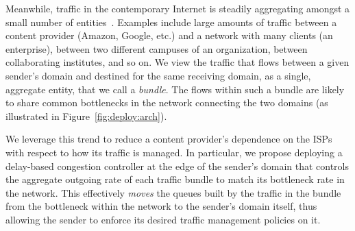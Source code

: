 \fi




Meanwhile, traffic in the contemporary Internet is steadily aggregating amongst a small number of entities~\cite{fivecomps}. 
Examples include large amounts of traffic between a content provider (\eg Amazon, Google, etc.) and a network with many clients (\eg an enterprise), between two different campuses of an organization, between collaborating institutes, and so on.
We view the traffic that flows between a given sender's domain and destined for the same receiving domain, as a single, aggregate entity, that we call a \emph{bundle}.
The flows within such a bundle are likely to share common bottlenecks in the network connecting the two domains (as illustrated in Figure~\ref{fig:deploy:arch}). %

We leverage this trend to reduce a content provider's dependence on the ISPs with respect to how its traffic is managed. In particular, we propose deploying a delay-based congestion controller at the edge of the sender's domain that controls the aggregate outgoing rate of each traffic bundle to match its bottleneck rate in the network. This effectively \emph{moves} the queues built by the traffic in the bundle from the bottleneck within the network to the sender’s domain itself, thus allowing the sender to enforce its desired traffic management policies on it. 

\fi







